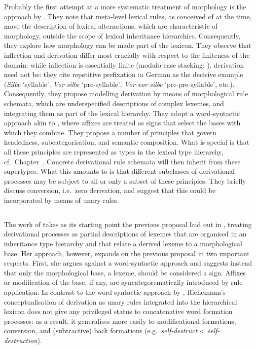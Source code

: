 \documentclass[output=paper,biblatex,babelshorthands,newtxmath,draftmode,colorlinks,citecolor=brown]{langscibook}
\begin{document}
Probably the first attempt at a more systematic treatment of
morphology is the approach by \citet{Krieger:Nerbonne:93}. They note
that meta-level lexical rules, as conceived of at the time, move the
description of lexical alternations, which are characteristic of
morphology, outside the scope of lexical inheritance
hierarchies. Consequently, they explore how morphology can be made
part of the lexicon. They observe that inflection and derivation
differ most crucially with respect to the finiteness of the domain:
while inflection is essentially finite (modulo case stacking;
\citealp{Sadler06,malouf:head-driven}), derivation need not be:
they cite repetitive prefixation in German as the decisive example
(\textit{Silbe} `syllable', \textit{Vor-silbe} `pre-syllable',
\textit{Vor-vor-silbe} `pre-pre-syllable', etc.). Consequently, they
propose  modelling derivation by means of morphological rule schemata,
which are underspecified descriptions of complex lexemes, and
integrating them as part of the lexical hierarchy. They adopt a
word-syntactic approach akin to \citet{Lieber92}, where affixes are
treated as signs that select the bases with which they combine. They
propose a number of principles that govern headedness,
subcategorisation, and semantic composition. What is special is that
all these principles are represented as types in the lexical type
hierarchy, cf.\ Chapter~. Concrete
derivational rule schemata will then inherit from these
supertypes. What this amounts to is that different subclasses of
derivational processes may be subject to all or only a subset of these
principles. They briefly discuss conversion, i.e.\ zero derivation, and
suggest that this could be incorporated by means of unary rules.



\subsection{\texorpdfstring{\protect\citet{Riehemann98}}{Riehemann (1998)}}
\label{morphology:sec-Riehemann}

The work of \citet{Riehemann98} takes as its starting point the
previous proposal laid out in \citet{Krieger:Nerbonne:93}, treating
derivational processes as partial descriptions of lexemes that are
organised in an inheritance type hierarchy and that relate a derived
lexeme to a morphological base.  Her approach, however, expands on the
previous proposal in two important respects. First, she argues against
a word-syntactic approach and suggests instead that only the
morphological base, a lexeme, should be considered a sign. Affixes or
modification of the base, if any, are syncategorematically introduced
by rule application. In contrast to the word-syntactic approach by
\citet{Krieger:Nerbonne:93}, Riehemann's conceptualisation of
derivation as unary rules integrated into the hierarchical lexicon
does not give any privileged status to concatenative word formation
processes: as a result, it generalises more easily to modificational
formations, conversion, and (subtractive) back formations (e.g.\
\textit{self-destruct} < \textit{self-destruction}).
\end{document}
